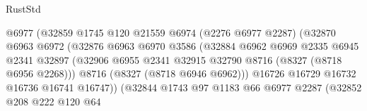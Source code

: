 \begin{lexlean}{RustStd}
\begin{coremodule}
{\begin{coremodule}
{{{{{{{{{{{{{{{{{{{{{{{{{{{{{{{{{{{{{{{{{{{{{{{{{{{{{{                                          @6977
                                          (@32859
                                            @1745
                                            @120
                                            @21559
                                            @6974
                                            (@2276 @6977 @2287)
                                            (@32870
                                              @6963
                                              @6972
                                              (@32876
                                                @6963
                                                @6970
                                                @3586
                                                (@32884
                                                  @6962
                                                  @6969
                                                  @2335
                                                  @6945
                                                  @2341
                                                  @32897
                                                  (@32906
                                                    @6955
                                                    @2341
                                                    @32915
                                                    @32790
                                                    @8716
                                                    (@8327 (@8718 @6956 @2268)))
                                                  @8716
                                                  (@8327 (@8718 @6946 @6962)))
                                                @16726
                                                @16729
                                                @16732
                                                @16736
                                                @16741
                                                @16747))
                                            (@32844
                                              @1743
                                              @97
                                              @1183
                                              @66
                                              @6977
                                              @2287
                                              (@32852
                                                @208
                                                @222
                                                @120
                                                @64
}}}}}}}}}}}}}}}}}}}}}}}}}}}}}}}}}}}}}}}}}}}}}}}}}}}}}}
\end{coremodule}}
\end{coremodule}
\end{lexlean}
